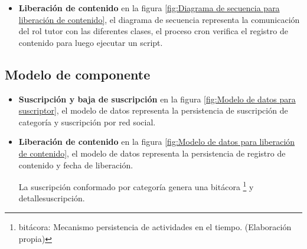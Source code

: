 \begin{itemize}
\begin{minipage}{1.0\textwidth}
	\centering
	\label{fig:Diagrama de secuencia para suscripción}
\end{minipage}

\item \textbf{Liberación de contenido}
en la figura \ref{fig:Diagrama de secuencia para liberación de contenido},
el diagrama de secuencia representa la comunicación del rol tutor con las
diferentes clases, el proceso cron verifica el registro de contenido para
luego ejecutar un script.

\begin{minipage}{1.0\textwidth}
	\centering
	\label{fig:Diagrama de secuencia para liberación de contenido}
\end{minipage}

\end{itemize}

\subsection{Modelo de componente}

\begin{itemize}

\item \textbf{Suscripción y baja de suscripción}
en la figura \ref{fig:Modelo de datos para suscriptor}, el modelo de datos
representa la persistencia de suscripción de categoría y suscripción por
red social.

\begin{minipage}{1.0\textwidth}
	\centering
	\label{fig:Modelo de datos para suscriptor}
\end{minipage}

\item \textbf{Liberación de contenido}
en la figura \ref{fig:Modelo de datos para liberación de contenido},
el modelo de datos representa la persistencia de registro de contenido
y fecha de liberación.

\begin{minipage}{1.0\textwidth}
	\centering
	\label{fig:Modelo de datos para liberación de contenido}
\end{minipage}

La suscripción conformado por categoría genera una bitácora \footnote{bitácora:
Mecanismo persistencia de actividades en el tiempo. (Elaboración propia)}
y detalle\textunderscore suscripción.

\end{itemize}

